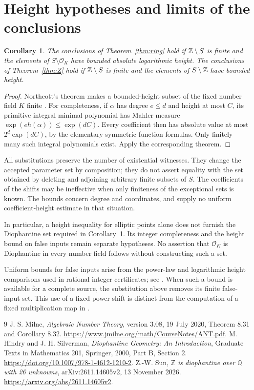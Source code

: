 \documentclass[11pt,a4paper]{article}
\newtheorem{corollary}[theorem]{Corollary}
\newcommand{\OK}{\mathcal O_K}
\begin{document}
\section{Height hypotheses and limits of the conclusions}
\begin{corollary}\label{cor:height}
The conclusions of Theorem~\ref{thm:ring} hold if
$\mathbb Z\setminus S$ is finite and the elements of $S\setminus\OK$
have bounded absolute logarithmic height. The conclusions of
Theorem~\ref{thm:Z} hold if $\mathbb Z\setminus S$ is finite and the
elements of $S\setminus\mathbb Z$ have bounded height.
\end{corollary}
\begin{proof}
Northcott's theorem makes a bounded-height subset of the fixed
number field $K$ finite \cite[Part~B, Section~2]{HS}.
For completeness, if $\alpha$ has degree $e\le d$ and height
at most $C$, its primitive integral minimal polynomial has
Mahler measure $\exp(eh(\alpha))\le\exp(dC)$.
Every coefficient then has absolute value at most
$2^d\exp(dC)$, by the elementary symmetric function formulas.
Only finitely many such integral polynomials exist.
Apply the corresponding theorem.
\end{proof}

All substitutions preserve the number of existential witnesses.
They change the accepted parameter set by composition; they do not
assert equality with the set obtained by deleting and adjoining
arbitrary finite subsets of $S$. The coefficients of the shifts
may be ineffective when only finiteness of the exceptional sets is
known. The bounds concern degree and coordinates, and supply no
uniform coefficient-height estimate in that situation.

In particular, a height inequality for elliptic points alone does
not furnish the Diophantine set required in
Corollary~\ref{cor:height}. Its integer completeness and the height
bound on false inputs remain separate hypotheses. No assertion
that $\OK$ is Diophantine in every number field follows without
constructing such a set.

Uniform bounds for false inputs arise from the power-law and
logarithmic height comparisons used in rational integer
certificates; see \cite[Sections~7 and~11]{Sun}.
When such a bound is available for a complete source, the
substitution above removes its finite false-input set.
This use of a fixed power shift is distinct from the computation
of a fixed multiplication map in \cite[Section~9]{Sun}.

\begin{thebibliography}{9}
 J. S. Milne, \emph{Algebraic Number Theory},
version 3.08, 19 July 2020, Theorem 8.31 and Corollary 8.32.
\url{https://www.jmilne.org/math/CourseNotes/ANT.pdf}.
 M. Hindry and J. H. Silverman,
\emph{Diophantine Geometry: An Introduction},
Graduate Texts in Mathematics 201, Springer, 2000,
Part B, Section 2. \url{https://doi.org/10.1007/978-1-4612-1210-2}.
 Z.-W. Sun, \emph{$\mathbb Z$ is diophantine over
$\mathbb Q$ with 26 unknowns}, arXiv:2611.14605v2,
13 November 2026. \url{https://arxiv.org/abs/2611.14605v2}.
\end{thebibliography}
\end{document}
